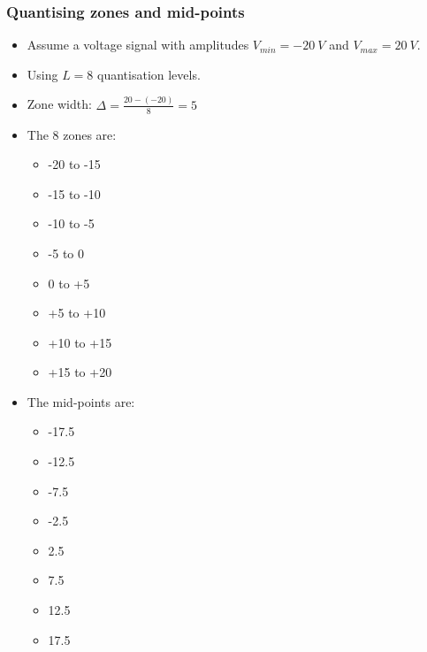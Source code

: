 \documentclass[11pt]{article}
\begin{document}
\subsubsection{Quantising zones and mid-points}
\label{sec:org4a59270}
\begin{itemize}
\item Assume a voltage signal with amplitudes \(V_{min} = \qty{-20}{V}\) and \(V_{max} = \qty{+20}{V}\).
\item Using \(L = 8\) quantisation levels.
\item Zone width: \(\Delta = \frac{20 - (- 20)}{8} = 5\)
\item The 8 zones are:
\begin{itemize}
\item -20 to -15
\item -15 to -10
\item -10 to -5
\item -5 to 0
\item 0 to +5
\item +5 to +10
\item +10 to +15
\item +15 to +20
\end{itemize}
\item The mid-points are:
\begin{itemize}
\item -17.5
\item -12.5
\item -7.5
\item -2.5
\item 2.5
\item 7.5
\item 12.5
\item 17.5
\end{itemize}
\end{itemize}

 \newpage
\end{document}
